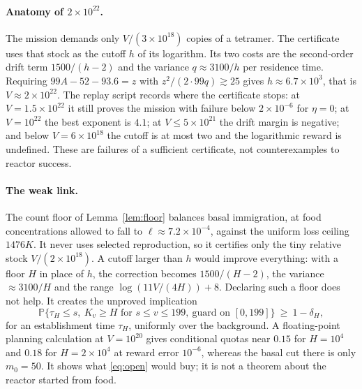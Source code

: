 \documentclass[11pt,letterpaper]{article}
\theoremstyle{plain}
\theoremstyle{definition}
\theoremstyle{remark}
\numberwithin{equation}{section}
\newcommand{\PP}{\mathbb P}
\begin{document}
\paragraph{Anatomy of $2\times10^{22}$.}
The mission demands only $V/(3\times10^{18})$ copies of a tetramer. The certificate uses that stock as the cutoff $h$ of its logarithm. Its two costs are the second-order drift term $1500/(h-2)$ and the variance $q\approx3100/h$ per residence time. Requiring $99A-52-93.6=z$ with $z^2/(2\cdot99q)\gtrsim25$ gives $h\approx6.7\times10^3$, that is $V\approx2\times10^{22}$. The replay script records where the certificate stops: at $V=1.5\times10^{22}$ it still proves the mission with failure below $2\times10^{-6}$ for $\eta=0$; at $V=10^{22}$ the best exponent is $4.1$; at $V\le5\times10^{21}$ the drift margin is negative; and below $V=6\times10^{18}$ the cutoff is at most two and the logarithmic reward is undefined. These are failures of a sufficient certificate, not counterexamples to reactor success.

\paragraph{The weak link.}
The count floor of Lemma~\ref{lem:floor} balances basal immigration, at food concentrations allowed to fall to $\ell\approx7.2\times10^{-4}$, against the uniform loss ceiling $1476K$. It never uses selected reproduction, so it certifies only the tiny relative stock $V/(2\times10^{18})$. A cutoff larger than $h$ would improve everything: with a floor $H$ in place of $h$, the correction becomes $1500/(H-2)$, the variance $\approx3100/H$ and the range $\log(11V/(4H))+8$. Declaring such a floor does not help. It creates the unproved implication
\begin{equation}\label{eq:open}
 \PP\bigl\{\tau_H\le s,\ K_v\ge H\text{ for }s\le v\le199,\ \text{guard on }[0,199]\bigr\}\ \ge\ 1-\delta_H ,
\end{equation}
for an establishment time $\tau_H$, uniformly over the background. A floating-point planning calculation at $V=10^{20}$ gives conditional quotas near $0.15$ for $H=10^4$ and $0.18$ for $H=2\times10^4$ at reward error $10^{-6}$, whereas the basal cut there is only $m_0=50$. It shows what \eqref{eq:open} would buy; it is not a theorem about the reactor started from food.
\end{document}
